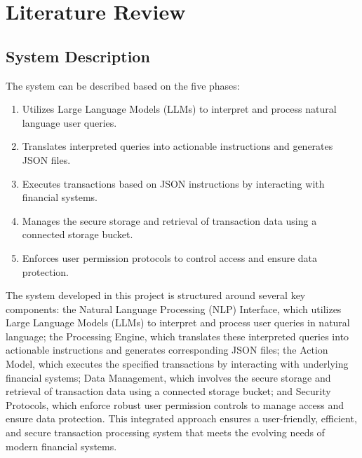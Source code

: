 \chapter{Literature Review}
 
\setcounter{equation}{0}

\section{System Description}

The system can be described based on the five phases: 
   \begin{enumerate}
        \item  Utilizes Large Language Models (LLMs) to interpret and process natural language user queries. 
        \item Translates interpreted queries into actionable instructions and generates JSON files. 
        \item Executes transactions based on JSON instructions by interacting with financial systems.
	\item Manages the secure storage and retrieval of transaction data using a connected storage bucket.
        \item Enforces user permission protocols to control access and ensure data protection.
    \end{enumerate}

\noindent The system developed in this project is structured around several key components: the Natural Language Processing (NLP) Interface, which utilizes Large Language Models (LLMs) to interpret and process user queries in natural language; the Processing Engine, which translates these interpreted queries into actionable instructions and generates corresponding JSON files; the Action Model, which executes the specified transactions by interacting with underlying financial systems; Data Management, which involves the secure storage and retrieval of transaction data using a connected storage bucket; and Security Protocols, which enforce robust user permission controls to manage access and ensure data protection. This integrated approach ensures a user-friendly, efficient, and secure transaction processing system that meets the evolving needs of modern financial systems. 

